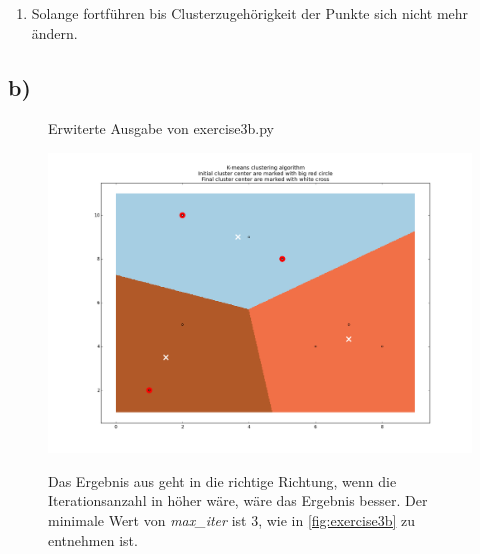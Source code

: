 \documentclass[a4paper,parskip=full-]{article}
\begin{document}
\begin{enumerate}

\item Solange fortführen bis Clusterzugehörigkeit der Punkte sich nicht mehr ändern.

\end{enumerate}

\subsection{b)}

\begin{figure}[H]
\caption{Erwiterte Ausgabe von exercise3b.py}
\label{fig:exercise3b}
\end{figure}

\begin{figure}[H]
\centering
\includegraphics[scale=0.5]{3b.png}

Das Ergebnis aus  geht in die richtige Richtung, 
wenn die Iterationsanzahl in  höher wäre, wäre das Ergebnis besser.
Der minimale Wert von \textit{max\_iter} ist $3$, wie in \autoref{fig:exercise3b} zu entnehmen ist.

\end{figure}
\end{document}
